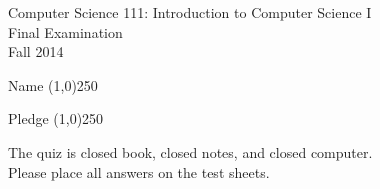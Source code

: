 \documentclass[12pt]{article}
\def\widow#1{\vskip #1\vbadness10000\penalty-200\vskip-#1}
\begin{document}

\def\widow#1{\vskip #1\vbadness10000\penalty-200\vskip-#1}

\begin{center}

Computer Science 111: Introduction to Computer Science I \\
Final Examination \\
Fall 2014 \\

\vspace{.25in}

Name \line(1,0){250}

Pledge \line(1,0){250}

\end{center}

\noindent


\medskip \noindent \begin{center} The quiz is closed book, closed notes, and closed computer. \\ Please place all
answers on the test sheets.  \end{center}
\end{document}
